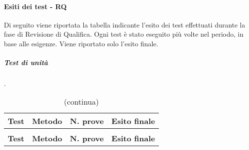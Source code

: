 		\paragraph{Esiti dei test - RQ}
	
		Di seguito viene riportata la tabella indicante l'esito dei test effettuati durante la fase di Revisione di Qualifica. Ogni test è stato eseguito più volte nel periodo, in base alle esigenze. Viene riportato solo l'esito finale.
		
		\subparagraph{Test di unità} {\color{white}.}
		
\renewcommand{\arraystretch}{1.5}
	
	\begin{longtable}{ >{\centering}p{}  >{\centering}p{} >{\centering}p{}
			>{\centering}p{}}
			
		\caption{   Esito test di unità - RQ}\\	
		\rowcolorhead
		\centering\textbf{\color{white}Test} 
		& \centering\textbf{\color{white}Metodo} 
		& \centering\textbf{\color{white}N. prove}
		& \centering\textbf{\color{white}Esito finale}
		
		\tabularnewline %
		\endfirsthead	
		
		\rowcolor{white}\caption[]{(continua)}\\	
		\rowcolorhead
		\centering\textbf{\color{white}Test} 
		& \centering\textbf{\color{white}Metodo} 
		& \centering\textbf{\color{white}N. prove}
		& \centering\textbf{\color{white}Esito finale}
		
		\tabularnewline %
		\endhead	
		

\end{longtable}

